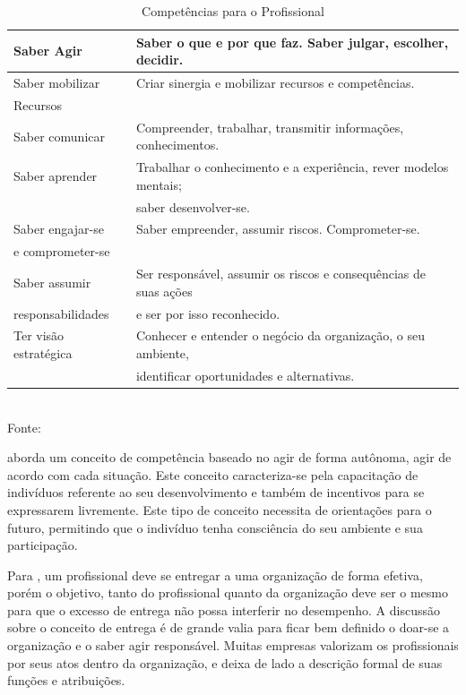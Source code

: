 \begin{table}[htbp]
	\centering
	\caption{Competências para o Profissional}
	\label{tab:competencia_profissional}
	\begin{tabular}{l|l} \hline

		\hline
		Saber Agir & Saber o que e por que faz. Saber julgar, escolher, decidir.\\
		\hline
		Saber mobilizar & Criar sinergia e mobilizar recursos e competências. \\ Recursos& \\
		\hline
		Saber comunicar & Compreender, trabalhar, transmitir informações, conhecimentos. \\
		\hline
		Saber aprender     & Trabalhar o conhecimento e a experiência, rever modelos mentais;\\
		&  saber desenvolver-se.\\
		\hline
		Saber engajar-se  & Saber empreender, assumir riscos. Comprometer-se.\\
		e comprometer-se &  \\
		\hline
		Saber assumir  & Ser responsável, assumir os riscos e consequências de suas ações \\
		responsabilidades & e ser por isso reconhecido. \\
		\hline
		Ter visão estratégica & Conhecer e entender o negócio da organização, o seu ambiente, \\
		& identificar oportunidades e alternativas.

		\\
		\hline
	\end{tabular}
	\vspace{2mm}
	\\ \footnotesize Fonte: 
\end{table}

 aborda um conceito de competência baseado no agir de forma autônoma, agir de acordo com cada situação. Este conceito caracteriza-se pela capacitação de indivíduos referente ao seu desenvolvimento e também de incentivos para se expressarem livremente. Este tipo de conceito necessita de orientações para o futuro, permitindo que o indivíduo tenha consciência do seu ambiente e sua participação.

Para , um profissional deve se entregar a uma organização de forma efetiva, porém o objetivo, tanto do profissional quanto da organização deve ser o mesmo para que o excesso de entrega não possa interferir no desempenho. A discussão sobre o conceito de entrega é de grande valia para ficar bem definido o doar-se a organização e o saber agir responsável. Muitas empresas valorizam os profissionais por seus atos dentro da organização, e deixa de lado a descrição formal de suas funções e atribuições.

